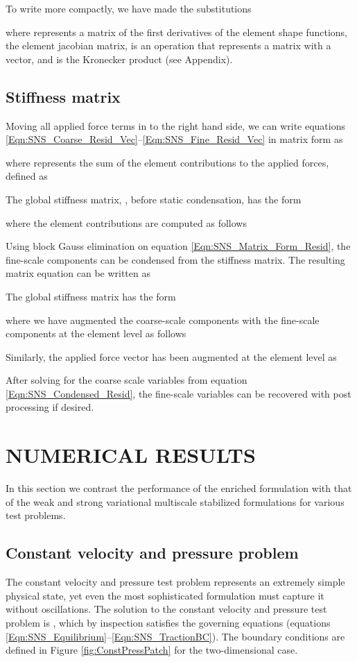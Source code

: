 \documentclass[11pt]{amsart}
\begin{document}
To write more compactly, we have made the substitutions

where  represents a matrix of the first derivatives of the element shape functions,   the element jacobian matrix,  is an operation that represents a matrix with a vector, and  is the Kronecker product \cite{Graham} (see Appendix). 
\subsection{Stiffness matrix}
Moving all applied force terms in  to the right hand side, we can write equations \eqref{Eqn:SNS_Coarse_Resid_Vec}--\eqref{Eqn:SNS_Fine_Resid_Vec} in matrix form as

where  represents the sum of the element contributions to the applied forces, defined as

The global stiffness matrix, , before static condensation, has the form

where the element contributions are computed as follows


Using block Gauss elimination on equation \eqref{Eqn:SNS_Matrix_Form_Resid}, the fine-scale components can be condensed from the stiffness matrix.  The resulting matrix equation can be written as

The global stiffness matrix has the form

where we have augmented the coarse-scale components with the fine-scale components at the element level as follows

Similarly, the applied force vector has been augmented at the element level as



After solving for the coarse scale variables from equation \eqref{Eqn:SNS_Condensed_Resid}, the fine-scale variables can be recovered with post processing if desired.
 \section{NUMERICAL RESULTS}

In this section we contrast the performance of the enriched formulation with that of the weak and strong variational multiscale stabilized formulations for various test problems. 

\subsection{Constant velocity and pressure problem}
The constant velocity and pressure test problem represents an extremely simple physical state, yet even the most sophisticated formulation must capture it without oscillations. The solution to the constant velocity and pressure test problem is , which by inspection satisfies the governing equations (equations \eqref{Eqn:SNS_Equilibrium}--\eqref{Eqn:SNS_TractionBC}).  The boundary conditions are defined in Figure \ref{fig:ConstPressPatch} for the two-dimensional case.
\end{document}
